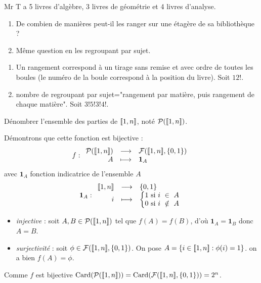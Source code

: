 \documentclass{book}
\begin{document}
\begin{Exercice}[rangement]
Mr T a 5 livres d'algèbre, 3 livres de géométrie et 4 livres d'analyse.
\begin{enumerate}
\item De combien de manières peut-il les ranger sur une étagère de sa bibliothèque ?
\item Même question en les regroupant par sujet.
\end{enumerate}
\begin{Correction}
\begin{enumerate}
\item Un rangement correspond à un tirage sans remise et avec ordre de toutes les boules (le numéro de la boule correspond à la position du livre). Soit $12!$.
\item nombre de regroupant par sujet="rangement par matière, puis rangement de chaque matière". Soit $3!5!3!4!$.
\end{enumerate}
\end{Correction}

\end{Exercice}
\begin{Exercice}
Dénombrer  l'ensemble des parties de $\mathopen\lbrack\!\lbrack1,n \mathclose\rbrack\!\rbrack$, noté $ \mathcal{P}(\mathopen\lbrack\!\lbrack1,n \mathclose\rbrack\!\rbrack)$. 
\begin{Correction}
Démontrons que cette fonction est bijective :
\[
f:
  \begin{array}{rcl}
    \mathcal{P}(\mathopen\lbrack\!\lbrack1,n \mathclose\rbrack\!\rbrack) & \longrightarrow & \mathcal{F}(\mathopen\lbrack\!\lbrack1,n \mathclose\rbrack\!\rbrack,\{0,1\}) \\
      A & \longmapsto & \mathbf 1_A \\
  \end{array}
\]avec $\mathbf 1_A$ fonction indicatrice de l'ensemble $A$
\[
\mathbf 1_A :\begin{array}{rcl}  \mathopen\lbrack\!\lbrack1,n \mathclose\rbrack\!\rbrack & \longrightarrow & \{0,1\}  \\
i & \longmapsto & \left\{\begin{matrix}  1 \ \mbox{si} \ i \ \in \ A \\ 0 \ \mbox{si} \ i \ \notin \ A \end{matrix}\right. \end{array}
\]
\begin{itemize}
\item \textit{injective }: soit $A,B\in \mathcal{P}(\mathopen\lbrack\!\lbrack1,n \mathclose\rbrack\!\rbrack)$ tel que $f(A)=f(B)$, d'où $\mathbf 1_A=\mathbf 1_B$ donc $A=B$.
\item \textit{surjectivité} : soit $\phi\in  \mathcal{F}(\mathopen\lbrack\!\lbrack1,n \mathclose\rbrack\!\rbrack,\{0,1\})$. On pose $A=\{i\in \mathopen\lbrack\!\lbrack1,n \mathclose\rbrack\!\rbrack:\phi(i)=1\}$. on a bien $f(A)=\phi$.
\end{itemize}
Comme $f$ est bijective $\text{Card}(\mathcal{P}(\mathopen\lbrack\!\lbrack1,n \mathclose\rbrack\!\rbrack))=\text{Card}(\mathcal{F}(\mathopen\lbrack\!\lbrack1,n \mathclose\rbrack\!\rbrack,\{0,1\}))=2^n$.
\end{Correction}

\end{Exercice}
\end{document}
